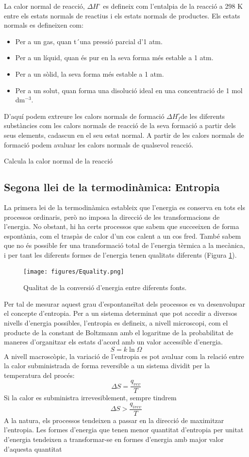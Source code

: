 La calor normal de reacció, $\Delta H^{\circ}$ es defineix com l'entalpia de la reacció a 298 K entre els estats normals de reactius i els estats normals de productes.
Els estats normals es defineixen com:
\begin{itemize}
\item Per a un gas, quan t´una pressió parcial d'1 atm.
\item Per a un líquid, quan és pur en la seva forma més estable a 1 atm.
\item Per a un sòlid, la seva forma més estable a 1 atm.
\item Per a un solut, quan forma una disolució ideal en una concentració de 1 mol dm$^{-3}$.
\end{itemize}
D'aquí podem extreure les calors normals de formació $\Delta H_f^{\circ}$de les diferents substàncies com les calors normals de reacció de la seva formació a partir dels seus elements, cadascun en el seu estat normal.
A partir de les calors normals de formació podem avaluar les calors normals de qualsevol reacció.
\begin{exr}
Calcula la calor normal de la reacció 
\end{exr}

\subsection{Segona llei de la termodinàmica: Entropia}

La primera lei de la termodinàmica estableix que l'energia es conserva en tots els processos ordinaris, però no imposa la direcció de les transformacions de l'energia.
No obstant, hi ha certs processos que sabem que succeeixen de forma espontània, com el traspàs de calor d'un cos calent a un cos fred.
També sabem que no és possible fer una transformació total de l'energia tèrmica a la mecànica, i per tant les diferents formes de l'energia tenen qualitats diferents (Figura \ref{fig:Equality}).
\begin{figure}[h]
\centering
\texttt{[image: figures/Equality.png]}
\caption{Qualitat de la conversió d'energia entre diferents fonts.\cite{Yen2008}}
\label{fig:Equality}
\end{figure}

Per tal de mesurar aquest grau d'espontaneïtat dels processos es va desenvolupar el concepte d'entropia. Per a un sistema determinat que pot accedir a diversos nivells d'energia possibles, l'entropia es defineix, a nivell microscopi, com el producte de la constant de Boltzmann amb el logaritme de la probabilitat de maneres d'organitzar els estats d'acord amb un valor accessible d'energia.
\[
S=k \ln \Omega
\]
A nivell macroscòpic, la variació de l'entropia es pot avaluar com la relació entre la calor subministrada de forma reversible a un sistema dividit per la temperatura del procés:
\[
\Delta S = \frac{q_{rev}}{T}
\]
Si la calor es subministra irrevesiblement, sempre tindrem 
\[
\Delta S > \frac{q_{irev}}{T}
\]
A la natura, els processos tendeixen a passar en la direcció de maximitzar l'entropia.
Les formes d'energia que tenen menor quantitat d'entropia per unitat d'energia tendeixen a transformar-se en formes d'energia amb major valor d'aquesta quantitat

